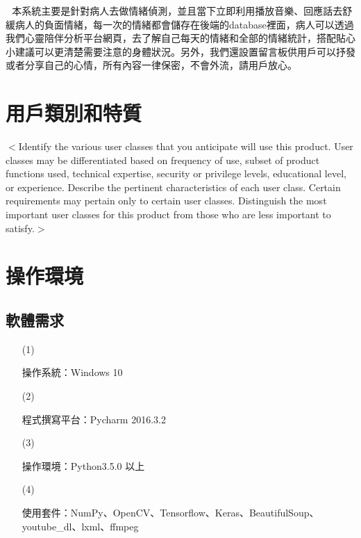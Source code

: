 \documentclass[12pt]{scrreprt}
\begin{document}
$~~~$本系統主要是針對病人去做情緒偵測，並且當下立即利用播放音樂、回應話去舒緩病人的負面情緒，每一次的情緒都會儲存在後端的database裡面，病人可以透過我們心靈陪伴分析平台網頁，去了解自己每天的情緒和全部的情緒統計，搭配貼心小建議可以更清楚需要注意的身體狀況。另外，我們還設置留言板供用戶可以抒發或者分享自己的心情，所有內容一律保密，不會外流，請用戶放心。

\section{用戶類別和特質}
$<$Identify the various user classes that you anticipate will use this product.  
User classes may be differentiated based on frequency of use, subset of product 
functions used, technical expertise, security or privilege levels, educational 
level, or experience. Describe the pertinent characteristics of each user class.  
Certain requirements may pertain only to certain user classes. Distinguish the 
most important user classes for this product from those who are less important 
to satisfy.$>$

\section{操作環境}

\subsection{軟體需求}
\begin{itemize}
\item[(1)]{\begin{bfseries}{操作系統：}Windows 10\end{bfseries}}
\item[(2)]{\begin{bfseries}{程式撰寫平台：}Pycharm 2016.3.2\end{bfseries}}
\item[(3)]{\begin{bfseries}{操作環境：}Python3.5.0 以上\end{bfseries}}
\item[(4)]{\begin{bfseries}{使用套件：}NumPy、OpenCV、Tensorflow、Keras、BeautifulSoup、\\
youtube_dl、lxml、ffmpeg\end{bfseries}}%
\end{itemize}
\end{document}
